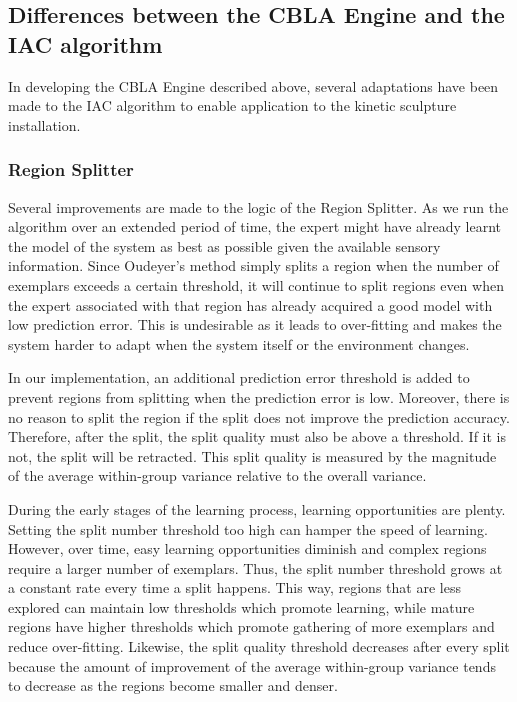 \subsection{Differences between the CBLA Engine and the IAC algorithm}

In developing the CBLA Engine described above, several adaptations have been made to the IAC algorithm to enable application to the kinetic sculpture installation. 

\subsubsection{Region Splitter}

Several improvements are made to the logic of the Region Splitter. As we run the algorithm over an extended period of time, the expert might have already learnt the model of the system as best as possible given the available sensory information. Since Oudeyer's method simply splits a region when the number of exemplars exceeds a certain threshold, it will continue to split regions even when the expert associated with that region has already acquired a good model with low prediction error. This is undesirable as it leads to over-fitting and makes the system harder to adapt when the system itself or the environment changes. 

In our implementation, an additional prediction error threshold is added to prevent regions from splitting when the prediction error is low. Moreover, there is no reason to split the region if the split does not improve the prediction accuracy. Therefore, after the split, the split quality must also be above a threshold. If it is not, the split will be retracted. This split quality is measured by the magnitude of the average within-group variance relative to the overall variance. 

During the early stages of the learning process, learning opportunities are plenty. Setting the split number threshold too high can hamper the speed of learning. However, over time, easy learning opportunities diminish and complex regions require a larger number of exemplars. Thus, the split number threshold grows at a constant rate every time a split happens. This way, regions that are less explored can maintain low thresholds which promote learning, while mature regions have higher thresholds which promote gathering of more exemplars and reduce over-fitting. Likewise, the split quality threshold decreases after every split because the amount of improvement of the average within-group variance tends to decrease as the regions become smaller and denser. 

